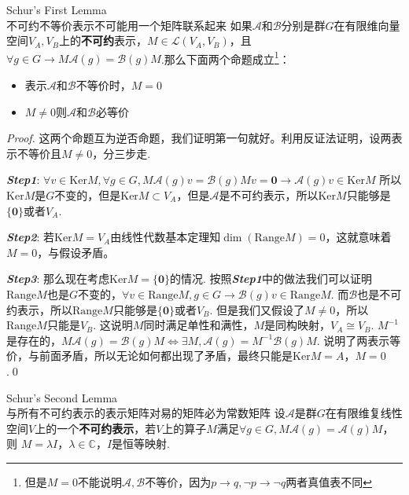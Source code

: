 \begin{theorem}{Schur's First Lemma\\不可约不等价表示不可能用一个矩阵联系起来}
    如果$\mathscr{A}$和$\mathscr{B}$分别是群$G$在有限维向量空间$V_A,V_B$上的\textbf{不可约}表示，$M\in \mathcal{L}(V_A,V_B)$，且$\forall g\in G\rightarrow M\mathscr{A}(g)=\mathscr{B}(g)M$.那么下面两个命题成立\footnote{但是$M=0$不能说明$\mathscr{A},\mathscr{B}$不等价，因为$p\rightarrow q ,\neg p\rightarrow\neg q$两者真值表不同}：
    \begin{itemize}
        \item 表示$\mathscr{A}$和$\mathscr{B}$不等价时，$M=0$
        \item $M \neq 0$则$\mathscr{A}$和$\mathscr{B}$必等价
    \end{itemize}
\end{theorem}
\begin{proof}
    这两个命题互为逆否命题，我们证明第一句就好。利用反证法证明，设两表示不等价且$M\neq 0$，分三步走.
    
    {\itshape \textbf{Step1}}: $\forall v\in\mathrm{Ker}M,\forall g\in G, M\mathscr{A}(g)v=\mathscr{B}(g)Mv=\mathbf{0}\rightarrow\mathscr{A}(g)v\in\mathrm{Ker}M$
    所以$\mathrm{Ker}M$是$G$不变的，但是$\mathrm{Ker}M\subset V_A$，但是$\mathscr{A}$是不可约表示，所以$\mathrm{Ker}M$只能够是$\{\mathbf{0}\}$或者$V_A$.

    {\itshape \textbf{Step2}}: 若$\mathrm{Ker}M=V_A$由线性代数基本定理知$\dim(\mathrm{Range}M)=0$，这就意味着$M=0$，与假设矛盾。
    
    {\itshape \textbf{Step3}}: 那么现在考虑$\mathrm{Ker}M=\{\mathbf{0}\}$的情况.
    按照{\itshape \textbf{Step1}}中的做法我们可以证明$\mathrm{Range}M$也是$G$不变的，$\forall v\in \mathrm{Range}M,g\in G\rightarrow \mathscr{B}(g)v\in\mathrm{Range}M$.
    而$\mathscr{B}$也是不可约表示，所以$\mathrm{Range}M$只能够是$\{\mathbf{0}\}$或者$V_B$. 但是我们又假设了$M\neq 0$，所以$\mathrm{Range}M$只能是$V_B$.
    这说明$M$同时满足单性和满性，$M$是同构映射，$V_A\cong V_B$. $M^{-1}$是存在的，$M\mathscr{A}(g)=\mathscr{B}(g)M\iff \exists M,\mathscr{A}(g)=M^{-1}\mathscr{B}(g)M$.
    说明了两表示等价，与前面矛盾，所以无论如何都出现了矛盾，最终只能是$\mathrm{Ker}M=A$，$M=0$.\qed
\end{proof}
\begin{theorem}{Schur's Second Lemma\\与所有不可约表示的表示矩阵对易的矩阵必为常数矩阵}
    设$\mathscr{A}$是群$G$在有限维复线性空间$V$上的一个\textbf{不可约表示}，若$V$上的算子$M$满足$\forall g\in G,M\mathscr{A}(g)=\mathscr{A}(g)M$，则
    $M=\lambda I$，$\lambda\in\mathbb{C}$，$I$是恒等映射.
\end{theorem}
